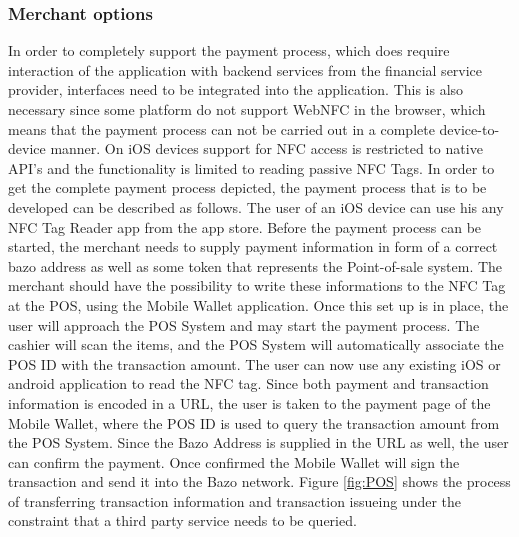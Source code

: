 \documentclass[a4paper]{article}
\begin{document}
\subsubsection{Merchant options}\label{fig:tps}
In order to completely support the payment process, which does require interaction of the application with backend services from the financial service provider, interfaces need to be integrated into the application.
This is also necessary since some platform do not support WebNFC in the browser, which means that the payment process can not be carried out in a complete device-to-device manner. On iOS devices support for NFC access is restricted to native API's and the functionality is limited to reading passive NFC Tags.
In order to get the complete payment process depicted, the payment process that is to be developed can be described as follows. The user of an iOS device can use his any NFC Tag Reader app from the app store. Before the payment process can be started, the merchant needs to supply payment information in form of a correct bazo address as well as some token that represents the Point-of-sale system. The merchant should have the possibility to write these informations to the NFC Tag at the POS, using the Mobile Wallet application.
Once this set up is in place, the user will approach the POS System and may start the payment process. The cashier will scan the items, and the POS System will automatically associate the POS ID with the transaction amount. The user can now use any existing iOS or android application to read the NFC tag. Since both payment and transaction information is encoded in a URL, the user is taken to the payment page of the Mobile Wallet, where the POS ID is used to query the transaction amount from the POS System. Since the Bazo Address is supplied in the URL as well, the user can confirm the payment. Once confirmed the Mobile Wallet will sign the transaction and send it into the Bazo network. Figure
\ref{fig:POS} shows the process of transferring transaction information and transaction issueing under the constraint that a third party service needs to be queried.
\end{document}
